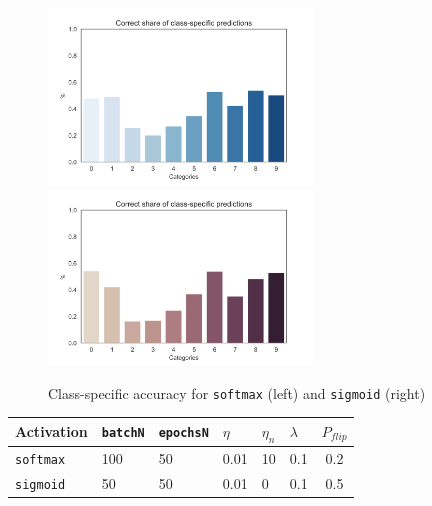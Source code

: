 \documentclass{article}
\begin{document}
	\begin{figure}[h!]
		\centering
		\includegraphics[width=7cm]{../plots/softmaxPreds.png}
		\includegraphics[width=7cm]{../plots/sigmoidPreds.png}
		\caption{Class-specific accuracy for \texttt{softmax} (left) and \texttt{sigmoid} (right)}
	\end{figure}
	\begin{center}
		\begin{tabular}{|l||l|l|l|l|l|c|}
			\hline
			Activation & \texttt{batchN} & \texttt{epochsN} & $\eta$ & $\eta_n$ & $\lambda$ & $P_{flip}$ \\ \hline
			\texttt{softmax} & 100 & 50 & 0.01 & 10 & 0.1 & 0.2 \\
			\texttt{sigmoid} & 50 & 50 & 0.01 & 0 & 0.1 & 0.5\\\hline
		\end{tabular}
	\end{center}
\end{document}
